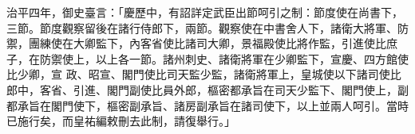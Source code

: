 \begin{pinyinscope}
 治平四年，御史臺言：「慶歷中，有詔詳定武臣出節呵引之制：節度使在尚書下，三節。節度觀察留後在諸行侍郎下，兩節。觀察使在中書舍人下，諸衛大將軍、防禦，團練使在大卿監下，內客省使比諸司大卿，景福殿使比將作監，引進使比庶子，在防禦使上，以上各一節。諸州刺史、諸衛將軍在少卿監下，宣慶、四方館使比少卿，宣
 政、昭宣、閣門使比司天監少監，諸衛將軍上，皇城使以下諸司使比郎中，客省、引進、閣門副使比員外郎，樞密都承旨在司天少監下、閣門使上，副都承旨在閣門使下，樞密副承旨、諸房副承旨在諸司使下，以上並兩人呵引。當時已施行矣，而皇祐編敕刪去此制，請復舉行。」



\end{pinyinscope}